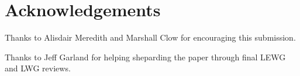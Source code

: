 \section{Acknowledgements}

Thanks to Alisdair Meredith and Marshall Clow for encouraging this submission.

Thanks to Jeff Garland for helping sheparding the paper through final LEWG and LWG reviews.
